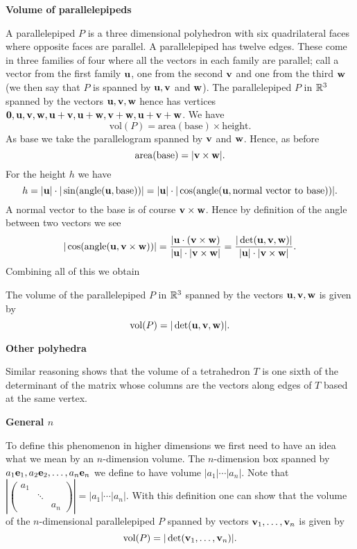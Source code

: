 \documentclass[10pt, a4paper]{article}
\begin{document}
\textbf{Volume of parallelepipeds}

A parallelepiped $P$ is a three dimensional polyhedron with six quadrilateral faces where opposite faces are parallel.
A parallelepiped has twelve edges.
These come in three families of four where all the vectors in each family are parallel;
call a vector from the first family $\mathbf{u}$,
one from the second $\mathbf{v}$ and one from the third $\mathbf{w}$
(we then say that $P$ is spanned by $\mathbf{u, v}$ and $\mathbf{w}$).
The parallelepiped $P$ in $\mathbb{R} ^ 3$ spanned by the vectors $\mathbf{u, v, w}$ hence has vertices $\mathbf{0, u, v, w, u + v, u + w, v + w, u + v + w}$.
We have
\[
\mathrm{vol}(P) = \mathrm{area}(\text{base}) \times \text{height}.
\]
As base we take the parallelogram spanned by $\mathbf{v}$ and $\mathbf{w}$.
Hence, as before
\[
\mathrm{area}(\text{base}) = |\mathbf{v \times w}|.
\]
For the height $h$ we have
\[
h = |\mathbf{u}| \cdot |\sin(\mathrm{angle}(\mathbf{u}, \text{base}))| = |\mathbf{u}| \cdot |\cos(\mathrm{angle}(\mathbf{u}, \text{normal vector to base}))|.
\]
A normal vector to the base is of course $\mathbf{v \times w}$.
Hence by definition of the angle between two vectors we see
\[
|\cos(\mathrm{angle}(\mathbf{u}, \mathbf{v} \times \mathbf{w}))| = \frac{|\mathbf{u} \cdot (\mathbf{v} \times \mathbf{w})}{|\mathbf{u}| \cdot |\mathbf{v} \times \mathbf{w}|} = \frac{|\det(\mathbf{u}, \mathbf{v}, \mathbf{w})|}{|\mathbf{u}| \cdot |\mathbf{v} \times \mathbf{w}|}.
\]
Combining all of this we obtain
\begin{proposition}
    The volume of the parallelepiped $P$ in $\mathbb{R} ^ 3$ spanned by the vectors $\mathbf{u, v, w}$ is given by
    \[
    \mathrm{vol}(P) = |\det(\mathbf{u, v, w})|.
    \]
\end{proposition}

\textbf{Other polyhedra}

Similar reasoning shows that the volume of a tetrahedron $T$ is one sixth of the determinant of the matrix whose columns are the vectors along edges of $T$ based at the same vertex.

\textbf{General $n$}

To define this phenomenon in higher dimensions we first need to have an idea what we mean by an $n$-dimension volume.
The $n$-dimension box spanned by $a_1\mathbf{e}_1, a_2\mathbf{e}_2, \dotsc, a_n\mathbf{e}_n$ we define to have volume $|a_1|\dotsi|a_n|$.
Note that $\left|\begin{pmatrix}
    a_1 & \phantom{} & \phantom{} \\ \phantom{} & \ddots & \phantom{} \\ \phantom{} & \phantom{} & a_n
\end{pmatrix}\right| = |a_1| \dotsi |a_n|$.
With this definition one can show that the volume of the $n$-dimensional parallelepiped $P$ spanned by vectors $\mathbf{v}_1, \dotsc, \mathbf{v}_n$ is given by
\[
\mathrm{vol}(P) = |\det(\mathbf{v}_1, \dotsc, \mathbf{v}_n)|.
\]
\end{document}
